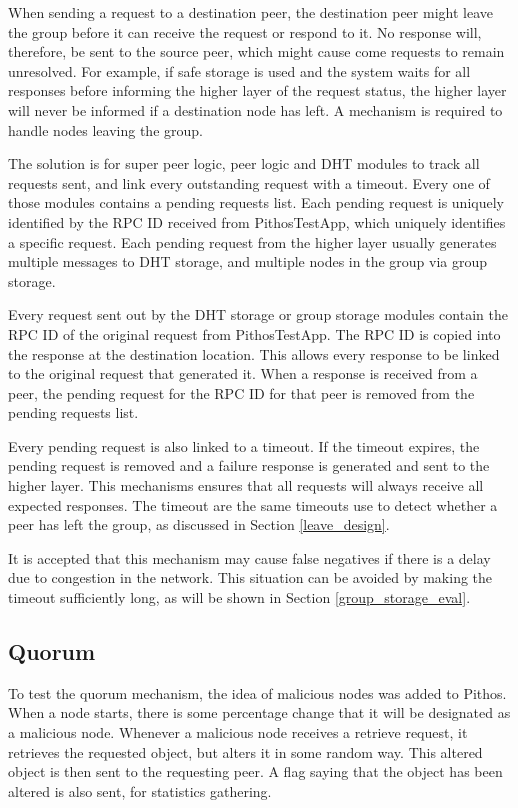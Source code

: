 When sending a request to a destination peer, the destination peer might leave the group before it can receive the request or respond to it. No response will, therefore, be sent to the source peer, which might cause come requests to remain unresolved. For example, if safe storage is used and the system waits for all responses before informing the higher layer of the request status, the higher layer will never be informed if a destination node has left. A mechanism is required to handle nodes leaving the group.

The solution is for super peer logic, peer logic and DHT modules to track all requests sent, and link every outstanding request with a timeout. Every one of those modules contains a pending requests list. Each pending request is uniquely identified by the RPC ID received from PithosTestApp, which uniquely identifies a specific request. Each pending request from the higher layer usually generates multiple messages to DHT storage, and multiple nodes in the group via group storage.

Every request sent out by the DHT storage or group storage modules contain the RPC ID of the original request from PithosTestApp. The RPC ID is copied into the response at the destination location. This allows every response to be linked to the original request that generated it. When a response is received from a peer, the pending request for the RPC ID for that peer is removed from the pending requests list.

Every pending request is also linked to a timeout. If the timeout expires, the pending request is removed and a failure response is generated and sent to the higher layer. This mechanisms ensures that all requests will always receive all expected responses. The timeout are the same timeouts use to detect whether a peer has left the group, as discussed in Section \ref{leave_design}.

It is accepted that this mechanism may cause false negatives if there is a delay due to congestion in the network. This situation can be avoided by making the timeout sufficiently long, as will be shown in Section \ref{group_storage_eval}.

\subsection{Quorum}
\label{object_verification_implementation}

To test the quorum mechanism, the idea of malicious nodes was added to Pithos. When a node starts, there is some percentage change that it will be designated as a malicious node. Whenever a malicious node receives a retrieve request, it retrieves the requested object, but alters it in some random way. This altered object is then sent to the requesting peer. A flag saying that the object has been altered is also sent, for statistics gathering.

